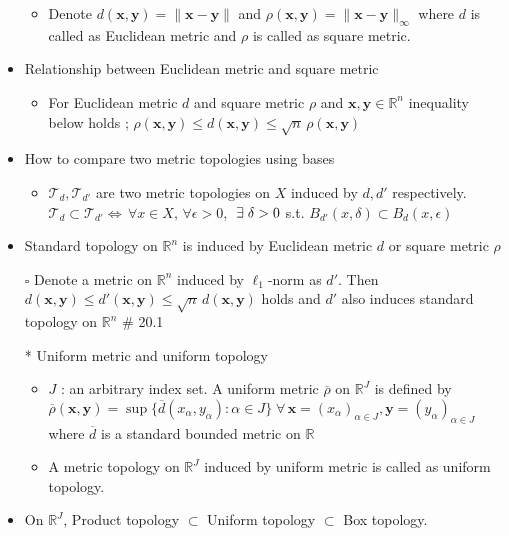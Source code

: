 \documentclass[12pt]{article}
\newcommand{\sq}{$\square$}
\newcommand{\spone}{\hspace{0.1cm}}
\newcommand{\Real}{\mathbb{R}}
\newcommand{\exist}{\exists\spone}
\begin{document}
\begin{itemize}
\begin{itemize}
		\item Denote $d(\textbf{x},\textbf{y})=\|\textbf{x}-\textbf{y}\|$ and $\rho(\textbf{x},\textbf{y})=\|\textbf{x}-\textbf{y}\|_\infty$ where $d$ is called as Euclidean metric and $\rho$ is called as square metric.
	\end{itemize}
	\item Relationship between Euclidean metric and square metric
	\begin{itemize}
		\item For Euclidean metric $d$ and square metric $\rho$ and $\textbf{x},\textbf{y}\in \Real^n$ inequality below holds ; $\rho(\textbf{x},\textbf{y})\leq d(\textbf{x},\textbf{y})\leq \sqrt{n}\,\rho(\textbf{x},\textbf{y})$
	\end{itemize}
	\item How to compare two metric topologies using bases
	\begin{itemize}
		\item $\mathcal{T}_d, \mathcal{T}_{d'}$ are two metric topologies on $X$ induced by $d, d'$ respectively. \\$\mathcal{T}_d\subset \mathcal{T}_{d'} \Leftrightarrow \, \forall x\in X, \,\forall \epsilon>0$, $\;\exist \delta>0$ s.t. $B_{d'}(x, \delta)\subset B_d(x,\epsilon)$
	\end{itemize}
	\item Standard topology on $\Real^n$ is induced by Euclidean metric $d$ or square metric $\rho$
	\item[\sq] Denote a metric on $\Real^n$ induced by $\ell_1$-norm as $d'$. Then $d(\textbf{x},\textbf{y})\leq d'(\textbf{x},\textbf{y})\leq \sqrt{n}\,d(\textbf{x},\textbf{y})$ holds and $d'$ also induces standard topology on $\Real^n$ \quad \# 20.1 
	\item[*] Uniform metric and uniform topology
	\begin{itemize}
		\item $J$ : an arbitrary index set. A uniform metric $\overline{\rho}$ on $\Real^J$ is defined by \\
		$\overline{\rho}(\textbf{x}, \textbf{y})=\sup\{\overline{d}(x_\alpha, y_\alpha) : \alpha \in J\} \; \forall \, \textbf{x}=(x_\alpha)_{\alpha\in J}, \textbf{y}=(y_\alpha)_{\alpha \in J}$\\  where $\overline{d}$ is a standard bounded metric on $\Real$
		\item A metric topology on $\Real^J$ induced by uniform metric is called as uniform topology.
	\end{itemize}
	\item On $\Real^J$, Product topology $\subset$ Uniform topology $\subset$ Box topology.

\end{itemize}
\end{document}

